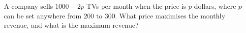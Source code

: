 A company sells $1000-2p$ TVs per month when the price is $p$ dollars, where $p$ can be set anywhere from $200$ to $300$. What price maximises the monthly revenue, and what is the maximum revenue?
